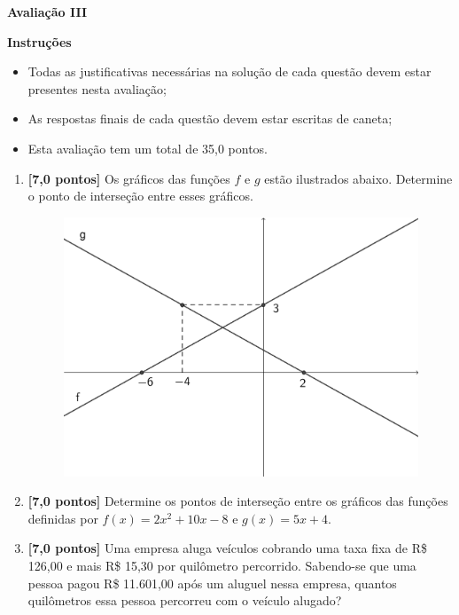 \documentclass[12pt,a4paper]{article}
\begin{document}
\begin{center}
 \textbf{Avaliação III}
\end{center}

\textbf{Instruções}
\begin{itemize}
 \item Todas as justificativas necessárias na solução de cada questão devem estar presentes nesta avaliação;
 \item As respostas finais de cada questão devem estar escritas de caneta;
 \item Esta avaliação tem um total de 35,0 pontos.
\end{itemize}

\begin{enumerate}
  \item \textbf{[7,0 pontos]} Os gráficos das funções $f$ e $g$ estão ilustrados abaixo. Determine o ponto de interseção entre esses gráficos.
  
    \begin{figure}[H]
     \centering
     \includegraphics[scale=0.6]{figura/grafico-lista-v-20.2.png}
    \end{figure}
  
  \item \textbf{[7,0 pontos]} Determine os pontos de interseção entre os gráficos das funções definidas por 
  $f(x) = 2x^2 + 10x - 8$ e $g(x) = 5x + 4$.
  
  \item \textbf{[7,0 pontos]} Uma empresa aluga veículos cobrando uma taxa fixa de R\$ 126,00 e mais
    R\$ 15,30 por quilômetro percorrido. Sabendo-se que uma pessoa pagou
    R\$ 11.601,00 após um aluguel nessa empresa, quantos quilômetros essa pessoa
    percorreu com o veículo alugado?


\end{enumerate}
\end{document}
